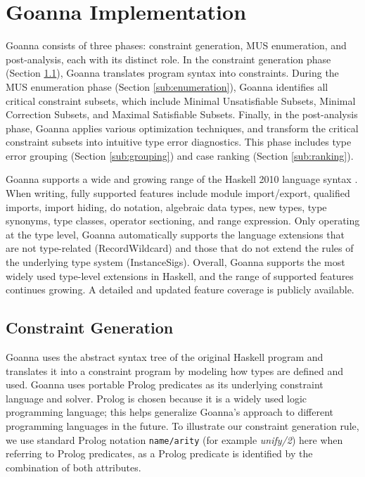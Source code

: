 \documentclass[pdflatex,lineno,sn-nature,Numbered]{sn-jnl}%
\begin{document}
    \section{Goanna Implementation} \label{sec:implementation}
Goanna consists of three phases: constraint generation, MUS enumeration, and post-analysis, each with its distinct role. In the constraint generation phase (Section \ref{sub:translation}), Goanna translates program syntax into constraints. During the MUS enumeration phase (Section \ref{sub:enumeration}), Goanna identifies all critical constraint subsets, which include Minimal Unsatisfiable Subsets, Minimal Correction Subsets, and Maximal Satisfiable Subsets. Finally, in the post-analysis phase, Goanna applies various optimization techniques, and transform the critical constraint subsets into intuitive type error diagnostics. This phase includes type error grouping (Section \ref{sub:grouping}) and case ranking (Section \ref{sub:ranking}).

    Goanna supports a wide and growing range of the Haskell 2010 language syntax \cite{Simon_Marlow2010-lg}. When writing, fully supported features include module import/export, qualified imports, import hiding, do notation, algebraic data types, new types, type synonyms, type classes, operator sectioning, and range expression. Only operating at the type level, Goanna automatically supports the language extensions that are not type-related (RecordWildcard) and those that do not extend the rules of the underlying type system (InstanceSigs). Overall, Goanna supports the most widely used type-level extensions in Haskell, and the range of supported features continues growing.  A detailed and updated feature coverage \cite{Fu2023-rp} is publicly available.

    \subsection{Constraint Generation} \label{sub:translation}

    Goanna uses the abstract syntax tree of the original Haskell program and translates it into a constraint program by modeling how types are defined and used. Goanna uses portable Prolog predicates \cite{Wielemaker2011-sr} as its underlying constraint language and solver. Prolog is chosen because it is a widely used logic programming language; this helps generalize Goanna's approach to different programming languages in the future. To illustrate our constraint generation rule, we use standard Prolog notation \texttt{name/arity} (for example {\it unify/2}) here when referring to Prolog predicates, as a Prolog predicate is identified by the combination of both attributes. 
\end{document}
